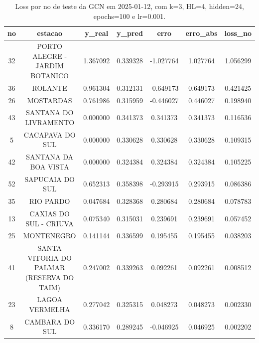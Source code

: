 \begin{table}[h]
\centering
\caption{Loss por no de teste da GCN em 2025-01-12, com k=3, HL=4, hidden=24, epochs=100 e lr=0.001.}
\label{tab:gcn_loss_k3_hl4_h24_e100_d20250112}
\begin{tabular}{ccccccc}
\toprule
no & estacao & y\_real & y\_pred & erro & erro\_abs & loss\_no \\
\midrule
32 & PORTO ALEGRE - JARDIM BOTANICO & 1.367092 & 0.339328 & -1.027764 & 1.027764 & 1.056299 \\
36 & ROLANTE & 0.961304 & 0.312131 & -0.649173 & 0.649173 & 0.421425 \\
26 & MOSTARDAS & 0.761986 & 0.315959 & -0.446027 & 0.446027 & 0.198940 \\
43 & SANTANA DO LIVRAMENTO & 0.000000 & 0.341373 & 0.341373 & 0.341373 & 0.116536 \\
5 & CACAPAVA DO SUL & 0.000000 & 0.330628 & 0.330628 & 0.330628 & 0.109315 \\
42 & SANTANA DA BOA VISTA & 0.000000 & 0.324384 & 0.324384 & 0.324384 & 0.105225 \\
52 & SAPUCAIA DO SUL & 0.652313 & 0.358398 & -0.293915 & 0.293915 & 0.086386 \\
35 & RIO PARDO & 0.047684 & 0.328368 & 0.280684 & 0.280684 & 0.078783 \\
13 & CAXIAS DO SUL - CRIUVA & 0.075340 & 0.315031 & 0.239691 & 0.239691 & 0.057452 \\
25 & MONTENEGRO & 0.141144 & 0.336599 & 0.195455 & 0.195455 & 0.038203 \\
41 & SANTA VITORIA DO PALMAR (RESERVA DO TAIM) & 0.247002 & 0.339263 & 0.092261 & 0.092261 & 0.008512 \\
23 & LAGOA VERMELHA & 0.277042 & 0.325315 & 0.048273 & 0.048273 & 0.002330 \\
8 & CAMBARA DO SUL & 0.336170 & 0.289245 & -0.046925 & 0.046925 & 0.002202 \\
\bottomrule
\end{tabular}
\end{table}
